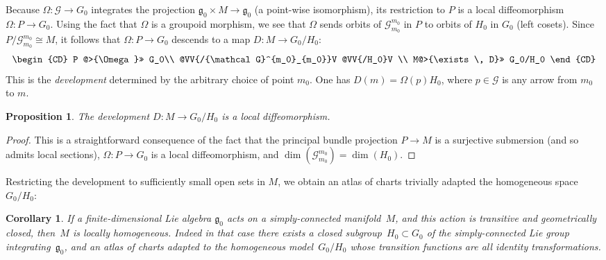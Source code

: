 \documentclass[11pt]{article}
\DeclareMathOperator{\dimension}{dim}
\numberwithin{equation}{section}
\newtheorem{CorollaryBlaom}[TheoremBlaom]{Corollary}
\newtheorem{PropositionBlaom}[TheoremBlaom]{Proposition}
 { \theoremstyle{definition}
\newtheorem{CounterexampleBlaom}[TheoremBlaom]{Counterexample}
\newtheorem{RemarkBlaom}[TheoremBlaom]{Remark} }
\begin{document}
Because $\Omega \colon {\mathcal G} \rightarrow G_0$ integrates the
projection ${\mathfrak g}_0 \times M \rightarrow {\mathfrak g}_0$ (a
point-wise isomorphism), its restriction to $P$ is a local
dif\/feomorphism $\Omega \colon P\rightarrow G_0$. Using the fact that
$\Omega$ is a groupoid morphism, we see that $\Omega$ sends orbits of
${\mathcal G}^{m_0}_{m_0}$ in $P$ to orbits of $H_0$ in $G_0$ (left
cosets). Since $P/{\mathcal G}^{m_0}_{m_0}\cong M$, it follows that
$\Omega\colon P\rightarrow G_0$ descends to a map $D \colon
M\rightarrow G_0/H_0$:
\begin{gather*}
  \begin{CD}
    P   @>{\Omega}>> G_0\\
    @VV{/{\mathcal G}^{m_0}_{m_0}}V @VV{/H_0}V \\
    M@>{\exists\, D}>> G_0/H_0
  \end{CD}
\end{gather*}
This is the {\it development} determined by the arbitrary choice of
point $m_0$. One has $D(m)=\Omega(p)H_0$, where $p \in {\mathcal G}$
is any arrow from $m_0$ to $m$.
\begin{PropositionBlaom}\label{Proposition4.3}
  The development $D \colon M \rightarrow {G_0/H_0}$ is a local
  diffeomorphism.
\end{PropositionBlaom}

\begin{proof}
  This is a straightforward consequence of the fact that the principal
  bundle projection $P \rightarrow M$ is a surjective submersion (and
  so admits local sections), $\Omega \colon P \rightarrow G_0$ is a
  local dif\/feomorphism, and $\dimension ({\mathcal
    G}^{m_0}_{m_0})=\dimension (H_0)$.
\end{proof}

Restricting the development to suf\/f\/iciently small open sets in $M$, we
obtain an atlas of charts trivially adapted the homogeneous space
${G_0/H_0}$:
\begin{CorollaryBlaom}\label{Corollary4.4}
  If a finite-dimensional Lie algebra ${\mathfrak g}_0$ acts on a
  simply-connected manifold~$M$, and this action is transitive and
  geometrically closed, then~$M$ is locally homogeneous. Indeed in
  that case there exists a closed subgroup~$H_0 \subset G_0$ of the
  simply-connected Lie group integrating~${\mathfrak g}_0$, and an
  atlas of charts adapted to the homogeneous model~$G_0/H_0$ whose
  transition functions are all identity transformations.
\end{CorollaryBlaom}
\end{document}
